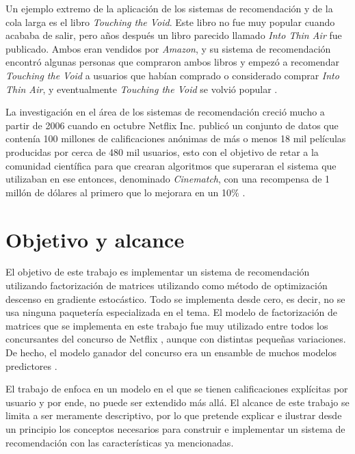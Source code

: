 Un ejemplo extremo de la aplicación de los sistemas de recomendación y de la cola larga es el libro \textit{Touching the Void}. Este libro no fue muy popular cuando acababa de salir, pero años después un libro parecido llamado \textit{Into Thin Air} fue publicado. Ambos eran vendidos por \textit{Amazon}, y su sistema de recomendación encontró algunas personas que compraron ambos libros y empezó a recomendar \textit{Touching the Void} a usuarios que habían comprado o considerado comprar \textit{Into Thin Air}, y eventualmente \textit{Touching the Void} se volvió popular \cite{leskovec_mining_2014}.


La investigación en el área de los sistemas de recomendación creció mucho a partir de 2006 cuando en octubre Netflix Inc. publicó un conjunto de datos que contenía 100 millones de calificaciones anónimas de más o menos 18 mil películas producidas por cerca de 480 mil usuarios, esto con el objetivo de retar a la comunidad científica para que crearan algoritmos que superaran el sistema que utilizaban en ese entonces, denominado \textit{Cinematch}, con una recompensa de 1 millón de dólares al primero que lo mejorara en un 10\% \cite{bell2007lessons} \cite{bennett2007netflix} \cite{netflixprize}.

\section{Objetivo y alcance}

El objetivo de este trabajo es implementar un sistema de recomendación utilizando factorización de matrices utilizando como método de optimización descenso en gradiente estocástico. Todo se implementa desde cero, es decir, no se usa ninguna paquetería especializada en el tema. El modelo de factorización de matrices que se implementa en este trabajo fue muy utilizado entre todos los concursantes del concurso de Netflix \cite{bell2008bellkor}, aunque con distintas pequeñas variaciones. De hecho, el modelo ganador del concurso era un ensamble de muchos modelos predictores \cite{bell2007lessons}.

El trabajo de enfoca en un modelo en el que se tienen calificaciones explícitas por usuario y por ende, no puede ser extendido más allá. El alcance de este trabajo se limita a ser meramente descriptivo, por lo que pretende explicar e ilustrar desde un principio los conceptos necesarios para construir e implementar un sistema de recomendación con las características ya mencionadas.
